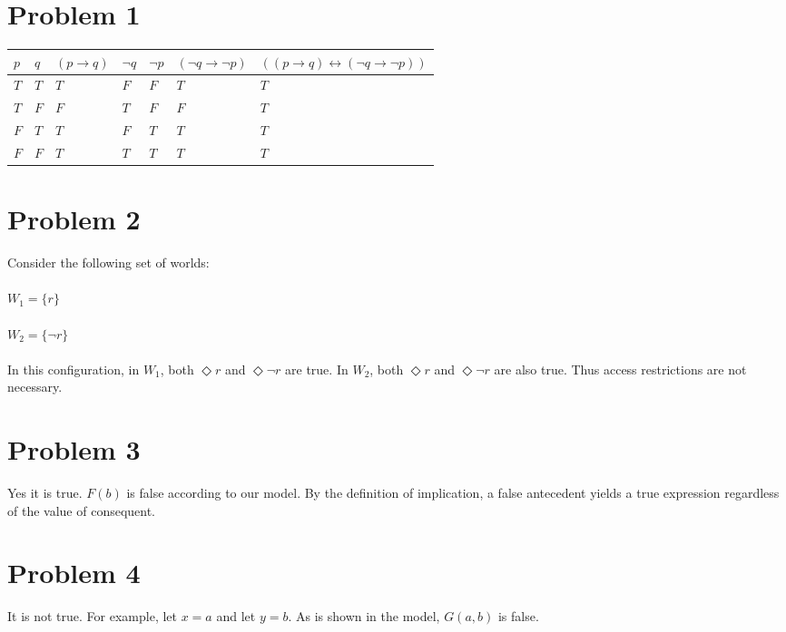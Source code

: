 \documentclass{article}%
\begin{document}
\section*{Problem 1}

\begin{tabular}{| l | l | l | l | l | l | l |}
    \hline
    $p$ & $q$ & $(p \rightarrow q)$ & $\neg q$ & $\neg p$ & $(\neg q \rightarrow \neg p)$ & $((p \rightarrow q) \leftrightarrow (\neg q \rightarrow \neg p))$ \\ \hline
    $T$ & $T$ & $T$                 & $F$      & $F$      & $T$                           & $T$ \\ \hline
    $T$ & $F$ & $F$                 & $T$      & $F$      & $F$                           & $T$ \\ \hline
    $F$ & $T$ & $T$                 & $F$      & $T$      & $T$                           & $T$ \\ \hline
    $F$ & $F$ & $T$                 & $T$      & $T$      & $T$                           & $T$ \\ \hline
\end{tabular}
\section*{Problem 2}
Consider the following set of worlds:\\
\\
$W_1 = \{r\}$\\
\\
$W_2 = \{\neg r\}$\\
\\
In this configuration, in $W_1$, both $\Diamond r$ and $\Diamond \neg r$ are true. In $W_2$, both $\Diamond r$ and $\Diamond \neg r$ are also
true. Thus access restrictions are not necessary.
\section*{Problem 3}
Yes it is true. $F(b)$ is false according to our model. By the definition of implication, a false antecedent yields a true expression
regardless of the value of consequent.

\section*{Problem 4}
It is not true. For example, let $x = a$ and let $y = b$. As is shown in the model, $G(a, b)$ is false.
\end{document}
